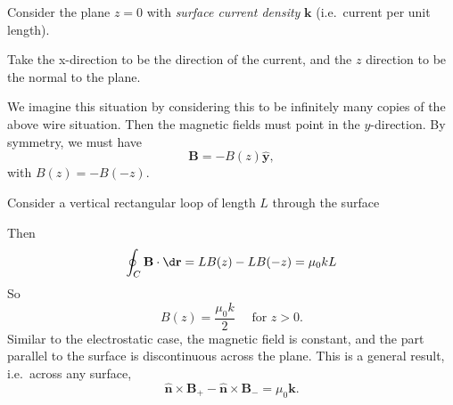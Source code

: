 \documentclass[a4paper]{article}
\begin{document}
\begin{eg}
  Consider the plane $z = 0$ with \emph{surface current density} $\mathbf{k}$ (i.e.\ current per unit length).
  \begin{center}
  \end{center}
  Take the x-direction to be the direction of the current, and the $z$ direction to be the normal to the plane.

  We imagine this situation by considering this to be infinitely many copies of the above wire situation. Then the magnetic fields must point in the $y$-direction. By symmetry, we must have
  \[
    \mathbf{B} = -B(z) \hat{\mathbf{y}},
  \]
  with $B(z) = -B(-z)$.

  Consider a vertical rectangular loop of length $L$ through the surface
  \begin{center}
  \end{center}
  Then
  \[
    \oint_C \mathbf{B}\cdot \d \mathbf{r} = LB(z) - LB(-z) = \mu_0 kL
  \]
  So
  \[
    B(z) = \frac{\mu_0 k}{2}\quad\text{ for }z > 0.
  \]
  Similar to the electrostatic case, the magnetic field is constant, and the part parallel to the surface is discontinuous across the plane. This is a general result, i.e.\ across any surface,
  \[
    \hat {\mathbf{n}} \times \mathbf{B}_+ - \hat{\mathbf{n}}\times \mathbf{B}_{-} = \mu_0 \mathbf{k}.
  \]
\end{eg}
\end{document}
